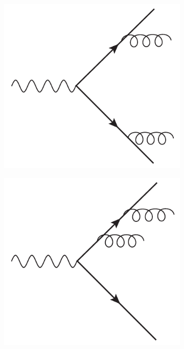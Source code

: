 \begin{figure}
\begin{center}
\begin{subfigure}{0.244\textwidth}
      \includegraphics[width=\textwidth]{Chapters/pQCD/gluon2.pdf}\caption{}\end{subfigure}
    \begin{subfigure}{0.244\textwidth}
      \includegraphics[width=\textwidth]{Chapters/pQCD/gluon3.pdf}\caption{}\end{subfigure}

\end{center}
\end{figure}
